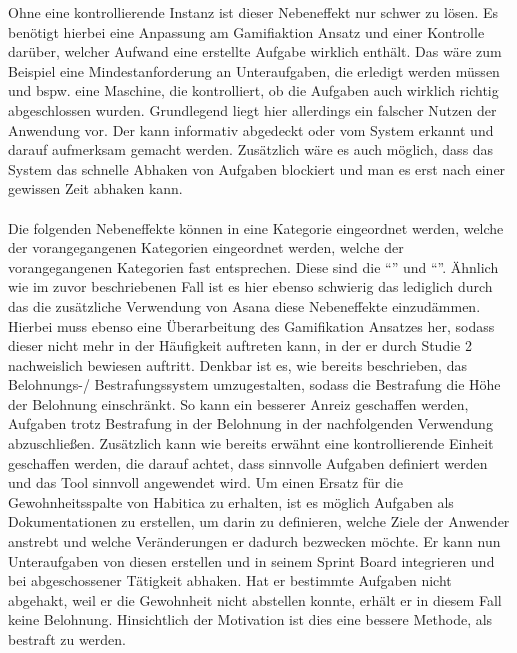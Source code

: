 \documentclass[sigconf, nonacm]{acmart}
\begin{document}
Ohne eine kontrollierende Instanz ist dieser Nebeneffekt nur schwer zu lösen. Es benötigt hierbei eine Anpassung am Gamifiaktion Ansatz und einer Kontrolle darüber, welcher Aufwand eine erstellte Aufgabe wirklich enthält. Das wäre zum Beispiel eine Mindestanforderung an Unteraufgaben, die erledigt werden müssen und bspw. eine Maschine, die kontrolliert, ob die Aufgaben auch wirklich richtig abgeschlossen wurden. Grundlegend liegt hier allerdings ein falscher Nutzen der Anwendung vor. Der kann informativ abgedeckt oder vom System erkannt und darauf aufmerksam gemacht werden. Zusätzlich wäre es auch möglich, dass das System das schnelle Abhaken von Aufgaben blockiert und man es erst nach einer gewissen Zeit abhaken kann.
\\
\\
Die folgenden Nebeneffekte können in eine Kategorie eingeordnet werden, welche der vorangegangenen Kategorien eingeordnet werden, welche der vorangegangenen Kategorien fast entsprechen. Diese sind die \enquote{} und \enquote{}. Ähnlich wie im zuvor beschriebenen Fall ist es hier ebenso schwierig das lediglich durch das die zusätzliche Verwendung von Asana diese Nebeneffekte einzudämmen. Hierbei muss ebenso eine Überarbeitung des Gamifikation Ansatzes her, sodass dieser nicht mehr in der Häufigkeit auftreten kann, in der er durch Studie 2 nachweislich bewiesen auftritt. Denkbar ist es, wie bereits beschrieben, das Belohnungs-/ Bestrafungssystem umzugestalten, sodass die Bestrafung die Höhe der Belohnung einschränkt. So kann ein besserer Anreiz geschaffen werden, Aufgaben trotz Bestrafung in der Belohnung in der nachfolgenden Verwendung abzuschließen. Zusätzlich kann wie bereits erwähnt eine kontrollierende Einheit geschaffen werden, die darauf achtet, dass sinnvolle Aufgaben definiert werden und das Tool sinnvoll angewendet wird. Um einen Ersatz für die Gewohnheitsspalte von Habitica zu erhalten, ist es möglich Aufgaben als Dokumentationen zu erstellen, um darin zu definieren, welche Ziele der Anwender anstrebt und welche Veränderungen er dadurch bezwecken möchte. Er kann nun Unteraufgaben von diesen erstellen und in seinem Sprint Board integrieren und bei abgeschossener Tätigkeit abhaken. Hat er bestimmte Aufgaben nicht abgehakt, weil er die Gewohnheit nicht abstellen konnte, erhält er in diesem Fall keine Belohnung. Hinsichtlich der Motivation ist dies eine bessere Methode, als bestraft zu werden.
 \\
 \\
\end{document}
